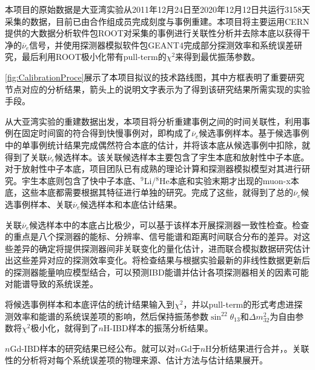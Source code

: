 \documentclass[a4paper,zihao=-4]{article}
\begin{document}
本项目的原始数据是大亚湾实验从2011年12月24日至2020年12月12日共运行3158天采集的数据，目前已由合作组成员完成刻度与事例重建。本项目将主要运用CERN提供的大数据分析软件包ROOT对采集的事例进行关联性分析并去除本底以获得干净的$\overline{\nu}_e$信号，并使用探测器模拟软件包GEANT4完成部分探测效率和系统误差研究，最后利用ROOT极小化带有pull-term的$\chi^2$来得到最优振荡参数。

\cref{fig:CalibrationProce}展示了本项目拟议的技术路线图，其中方框表明了重要研究节点对应的分析结果，箭头上的说明文字表示为了得到该研究结果所需实现的实验手段。

从大亚湾实验的重建数据出发，本项目将分析重建事例之间的时间关联性，利用事例在固定时间窗的符合得到快慢事例对，即构成了$\overline{\nu}_e$候选事例样本。基于候选事例中的单事例统计结果完成偶然符合本底的估计，并将该本底从候选事例中扣除，就得到了关联$\overline{\nu}_e$候选样本。该关联候选样本主要包含了宇生本底和放射性中子本底。对于放射性中子本底，项目团队已有成熟的理论计算和探测器模拟模型对其进行研究。宇生本底则包含了快中子本底、$^9$Li/$^8$He本底和实验末期才出现的muon-x本底，这些本底都需要根据其特征进行单独的研究。完成了这些，就得到了总的$\overline{\nu}_e$候选事例样本、关联$\overline{\nu}_e$候选样本和本底估计结果。

关联$\overline{\nu}_e$候选样本中的本底占比极少，可以基于该样本开展探测器一致性检查。检查的重点是八个探测器的能标、分辨率、信号能谱和距离时间联合分布的差异。对这些差异的确定将提供探测器间非关联变化的量化估计，进而联合模拟数据研究估计出这些差异对应的探测效率变化。将检查结果与根据实验最新的非线性数据更新后的探测器能量响应模型结合，可以预测IBD能谱并估计各项探测器相关的因素可能对能谱导致的系统误差。

将候选事例样本和本底评估的统计结果输入到$\chi^2$，并以pull-term的形式考虑进探测效率和能谱的系统误差项的影响，然后保持振荡参数$\sin^22\theta_{13}$和$\Delta m_{32}^2$为自由参数将$\chi^2$极小化，就得到了$n$H-IBD样本的振荡分析结果。

$n$Gd-IBD样本的研究结果已经公布。就可以对$n$Gd于$n$H分析结果进行合并，。关联性的分析将对每个系统误差项的物理来源、估计方法与估计结果展开。
\end{document}
